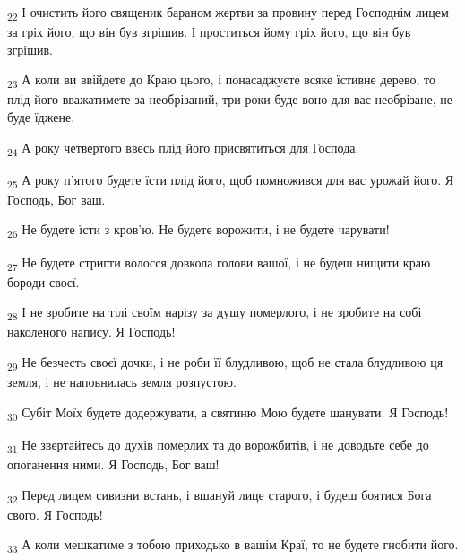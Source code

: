 \begin{tcolorbox}
\textsubscript{22} І очистить його священик бараном жертви за провину перед Господнім лицем за гріх його, що він був згрішив. І проститься йому гріх його, що він був згрішив.
\end{tcolorbox}
\begin{tcolorbox}
\textsubscript{23} А коли ви ввійдете до Краю цього, і понасаджуєте всяке їстивне дерево, то плід його вважатимете за необрізаний, три роки буде воно для вас необрізане, не буде їджене.
\end{tcolorbox}
\begin{tcolorbox}
\textsubscript{24} А року четвертого ввесь плід його присвятиться для Господа.
\end{tcolorbox}
\begin{tcolorbox}
\textsubscript{25} А року п'ятого будете їсти плід його, щоб помножився для вас урожай його. Я Господь, Бог ваш.
\end{tcolorbox}
\begin{tcolorbox}
\textsubscript{26} Не будете їсти з кров'ю. Не будете ворожити, і не будете чарувати!
\end{tcolorbox}
\begin{tcolorbox}
\textsubscript{27} Не будете стригти волосся довкола голови вашої, і не будеш нищити краю бороди своєї.
\end{tcolorbox}
\begin{tcolorbox}
\textsubscript{28} І не зробите на тілі своїм нарізу за душу померлого, і не зробите на собі наколеного напису. Я Господь!
\end{tcolorbox}
\begin{tcolorbox}
\textsubscript{29} Не безчесть своєї дочки, і не роби її блудливою, щоб не стала блудливою ця земля, і не наповнилась земля розпустою.
\end{tcolorbox}
\begin{tcolorbox}
\textsubscript{30} Субіт Моїх будете додержувати, а святиню Мою будете шанувати. Я Господь!
\end{tcolorbox}
\begin{tcolorbox}
\textsubscript{31} Не звертайтесь до духів померлих та до ворожбитів, і не доводьте себе до опоганення ними. Я Господь, Бог ваш!
\end{tcolorbox}
\begin{tcolorbox}
\textsubscript{32} Перед лицем сивизни встань, і вшануй лице старого, і будеш боятися Бога свого. Я Господь!
\end{tcolorbox}
\begin{tcolorbox}
\textsubscript{33} А коли мешкатиме з тобою приходько в вашім Краї, то не будете гнобити його.
\end{tcolorbox}
